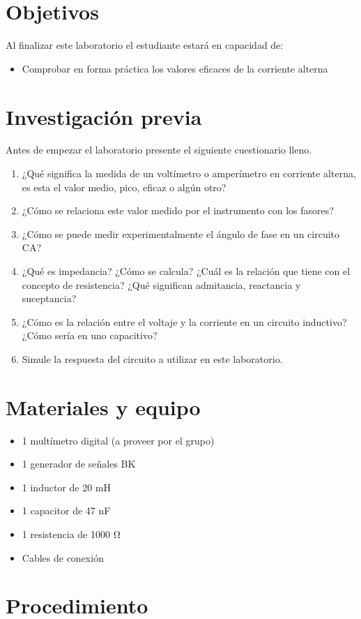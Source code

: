 \documentclass{report}
\newcommand{\obj}{Objetivos}
\newcommand{\inv}{Investigación previa}
\newcommand{\mat}{Materiales y equipo}
\newcommand{\pro}{Procedimiento}
\newcommand{\capacidad}{Al finalizar este laboratorio el estudiante estará en capacidad de:}
\newcommand{\antesde}{Antes de empezar el laboratorio presente el siguiente cuestionario lleno.}
\begin{document}
\section{\obj}
\capacidad
\begin{itemize}
\item Comprobar en forma práctica los valores eficaces de la corriente alterna
\end{itemize}

\section{\inv}
\antesde
\begin{enumerate}
\item ¿Qué significa la medida de un voltímetro o amperímetro en corriente alterna,
es esta el valor medio, pico, eficaz o algún otro?
\item ¿Cómo se relaciona este valor medido por el instrumento con los fasores?
\item ¿Cómo se puede medir experimentalmente el ángulo de fase en un circuito
CA?
\item ¿Qué es impedancia? ¿Cómo se calcula? ¿Cuál es la relación que tiene con
el concepto de resistencia? ¿Qué significan admitancia, reactancia y
suceptancia?
\item ¿Cómo es la relación entre el voltaje y la corriente en un circuito inductivo?
¿Cómo sería en uno capacitivo?
\item Simule la respuesta del circuito a utilizar en este laboratorio.
\end{enumerate}

\section{\mat}

\begin{itemize}
\item 1 multímetro digital (a proveer por el grupo)
\item 1 generador de señales BK
\item 1 inductor de 20 \si{\milli\henry}
\item 1 capacitor de 47 \si{\nano\farad}
\item 1 resistencia de 1000 \si{\ohm}
\item Cables de conexión
\end{itemize}

\section{\pro}
\end{document}
